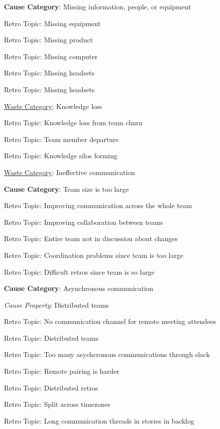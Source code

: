 \quad \textbf{Cause Category}: Missing information, people, or equipment

\quad \quad Retro Topic: Missing equipment

\quad \quad Retro Topic: Missing product

\quad \quad Retro Topic: Missing computer

\quad \quad Retro Topic: Missing headsets

\quad \quad Retro Topic: Missing headsets


\underline{Waste Category}: Knowledge loss

\quad \quad Retro Topic: Knowledge loss from team churn

\quad \quad Retro Topic: Team member departure

\quad \quad Retro Topic: Knowledge silos forming



\underline{Waste Category}: Ineffective communication

\quad \textbf{Cause Category}: Team size is too large

\quad \quad Retro Topic: Improving communication across the whole team

\quad \quad Retro Topic: Improving collaboration between teams

\quad \quad Retro Topic: Entire team not in discussion about changes

\quad \quad Retro Topic: Coordination problems since team is too large

\quad \quad Retro Topic: Difficult retros since team is so large

\quad \textbf{Cause Category}: Asynchronous communication

\quad \quad \textit{Cause Property}: Distributed teams

\quad \quad \quad Retro Topic: No communication channel for remote meeting attendees

\quad \quad \quad Retro Topic: Distributed teams

\quad \quad \quad Retro Topic: Too many asychcronous communications through slack

\quad \quad \quad Retro Topic: Remote pairing is harder

\quad \quad \quad Retro Topic: Distributed retros

\quad \quad \quad Retro Topic: Split across timezones

\quad \quad \quad Retro Topic: Long communication threads in stories in backlog


